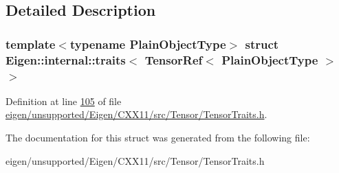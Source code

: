 \subsection{Detailed Description}
\subsubsection*{template$<$typename Plain\+Object\+Type$>$\newline
struct Eigen\+::internal\+::traits$<$ Tensor\+Ref$<$ Plain\+Object\+Type $>$ $>$}



Definition at line \hyperlink{eigen_2unsupported_2_eigen_2_c_x_x11_2src_2_tensor_2_tensor_traits_8h_source_l00105}{105} of file \hyperlink{eigen_2unsupported_2_eigen_2_c_x_x11_2src_2_tensor_2_tensor_traits_8h_source}{eigen/unsupported/\+Eigen/\+C\+X\+X11/src/\+Tensor/\+Tensor\+Traits.\+h}.



The documentation for this struct was generated from the following file\+:\begin{DoxyCompactItemize}
\item 
eigen/unsupported/\+Eigen/\+C\+X\+X11/src/\+Tensor/\+Tensor\+Traits.\+h\end{DoxyCompactItemize}
